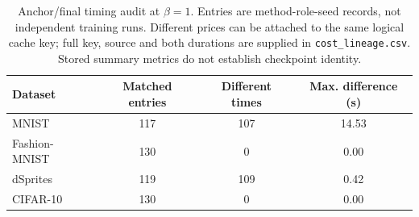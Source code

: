 \begin{table}[H]
\caption{Anchor/final timing audit at $\beta=1$. Entries are method-role-seed records, not independent training runs. Different prices can be attached to the same logical cache key; full key, source and both durations are supplied in \texttt{cost\_lineage.csv}. Stored summary metrics do not establish checkpoint identity.}\label{tab:timing_audit}
\small
\setlength{\tabcolsep}{3pt}
\begin{tabular*}{\textwidth}{@{\extracolsep{\fill}}lccc@{}}
\toprule
Dataset & Matched entries & Different times & Max. difference (s) \\
\midrule
MNIST & 117 & 107 & 14.53 \\
Fashion-MNIST & 130 & 0 & 0.00 \\
dSprites & 119 & 109 & 0.42 \\
CIFAR-10 & 130 & 0 & 0.00 \\
\bottomrule\end{tabular*}
\end{table}
